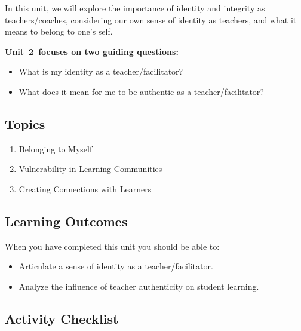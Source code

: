 \documentclass[
]{book}
\providecommand{\tightlist}{%
  \setlength{\itemsep}{0pt}\setlength{\parskip}{0pt}}
\begin{document}
In this unit, we will explore the importance of identity and integrity as teachers/coaches, considering our own sense of identity as teachers, and what it means to belong to one's self.

\textbf{Unit~2~focuses on two guiding questions:}

\begin{itemize}
\tightlist
\item
  What is my identity as a teacher/facilitator?\\
\item
  What does it mean for me to be authentic as a teacher/facilitator?
\end{itemize}

\hypertarget{topics-1}{%
\subsection*{Topics}\label{topics-1}}

\begin{enumerate}
\def\labelenumi{\arabic{enumi}.}
\tightlist
\item
  Belonging to Myself\\
\item
  Vulnerability in Learning Communities\\
\item
  Creating Connections with Learners
\end{enumerate}

\hypertarget{learning-outcomes-1}{%
\subsection*{Learning Outcomes}\label{learning-outcomes-1}}

When you have completed this unit you should be able to:

\begin{itemize}
\tightlist
\item
  Articulate a sense of identity as a teacher/facilitator.\\
\item
  Analyze the influence of teacher authenticity on student learning.
\end{itemize}

\hypertarget{activity-checklist-1}{%
\subsection*{Activity Checklist}\label{activity-checklist-1}}
\end{document}

